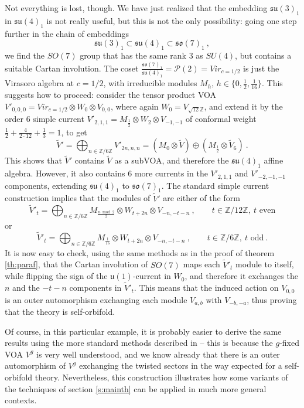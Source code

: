 \documentclass[11pt,reqno]{article}
\newcommand{\be}{\begin{equation}}
\newcommand{\ee}{\end{equation}}
\newcommand{\ZZ}{\mathbb{Z}}
\newcommand{\paraf}{\mathcal{P}}
\newcommand{\alg}[1]{\mathfrak{#1}}
\begin{document}
Not everything is lost, though. We have just realized that the embedding $\alg{su}(3)_1$ in $\alg{su}(4)_1$ is not really useful, but this is not the only possibility: going one step further in the chain of embeddings \be \alg{su}(3)_1\subset \alg{su}(4)_1\subset \alg{so}(7)_1\ ,\ee we find the $SO(7)$ group that has the same rank $3$ as $SU(4)$, but contains a suitable Cartan involution. The coset $\frac{\alg{so}(7)_1}{\alg{su}(4)_1}=\paraf(2)=Vir_{c=1/2}$ is just the Virasoro algebra at $c=1/2$, with irreducible modules $M_h$, $h\in \{0,\frac{1}{2},\frac{1}{16}\}$. This suggests how to proceed: consider the tensor product VOA $V'_{0,0,0}=Vir_{c=1/2}\otimes W_0\otimes V_{0,0}$, where again $W_0=V_{\sqrt{12}\ZZ}$, and extend it by the order $6$ simple current $V'_{2,1,1}=M_{\frac{1}{2}}\otimes W_2\otimes V_{-1,-1}$ of conformal weight $\frac{1}{2}+\frac{4}{2\cdot 12}+\frac{1}{3}=1$, to  get
\be \tilde V'=\bigoplus_{n\in \ZZ/6\ZZ} V'_{2n,n,n}=(M_{0}\otimes\tilde V) \oplus (M_{\frac{1}{2}}\otimes \tilde V_{6})\ .
\ee This shows that $\tilde V'$ contains $\tilde V$ as a subVOA, and therefore the $\alg{su}(4)_1$ affine algebra. However, it also contains $6$ more currents in the $V'_{2,1,1}$ and $V'_{-2,-1,-1}$ components, extending $\alg{su}(4)_1$ to $\alg{so}(7)_1$. The standard simple current construction implies that the modules of $\tilde V'$ are either of the form
\be \tilde V'_{t}=\bigoplus_{n\in \ZZ/6\ZZ} M_{\frac{n\bmod 2}{2}}\otimes W_{t+2n}\otimes V_{-n,-t-n}\ ,\qquad t\in \ZZ/12\ZZ,\ t\text{ even}
\ee or
\be
\tilde V'_{t}=\bigoplus_{n\in \ZZ/6\ZZ} M_{\frac{1}{16}}\otimes W_{t+2n}\otimes V_{-n,-t-n}\ ,\qquad t\in \ZZ/6\ZZ,\ t\text{ odd}\ .
\ee 
 It is now easy to check, using the same methods as in the proof of theorem \ref{th:paraf}, that the Cartan involution of $SO(7)$ maps each $\tilde V'_t$ module to itself, while flipping the sign of the $\alg{u}(1)$-current in $W_0$, and therefore it exchanges the $n$ and the $-t-n$ components in $\tilde V'_t$. This means that the induced action on $V_{0,0}$ is an outer automorphism exchanging each module $V_{a,b}$ with $V_{-b,-a}$, thus proving that the theory is self-orbifold.

Of course, in this particular example, it is probably easier to derive the same results using the more standard methods described in \cite{Burbano:2021loy} -- this is because the $g$-fixed VOA $V^g$ is very well understood, and we know already that there is an outer automorphism of $V^g$ exchanging the twisted sectors in the way expected for a self-orbifold theory.  Nevertheless, this construction illustrates how some variants of the techniques of section \ref{s:mainth} can be applied in much more general contexts.
\end{document}
